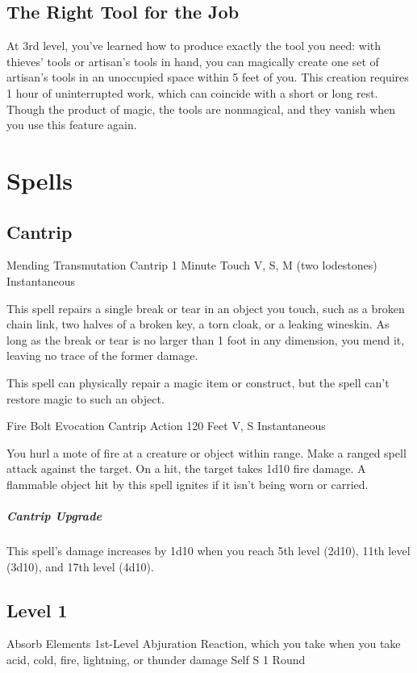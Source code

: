\documentclass[letterpaper,openany,oneside,twocolumn]{book}
\begin{document}
\subsection*{The Right Tool for the Job}
At 3rd level, you've learned how to produce exactly the tool you need: with thieves' tools or artisan's tools in hand, you can magically create one set of artisan's tools in an unoccupied space within 5 feet of you. This creation requires 1 hour of uninterrupted work, which can coincide with a short or long rest. Though the product of magic, the tools are nonmagical, and they vanish when you use this feature again.

\section*{Spells}
\subsection*{Cantrip}

\DndSpellHeader
  {Mending}
  {Transmutation Cantrip}
  {1 Minute}
  {Touch}
  {V, S, M (two lodestones)}
  {Instantaneous}

This spell repairs a single break or tear in an object you touch, such as a broken chain link, two halves of a broken key, a torn cloak, or a leaking wineskin. As long as the break or tear is no larger than 1 foot in any dimension, you mend it, leaving no trace of the former damage.

This spell can physically repair a magic item or construct, but the spell can't restore magic to such an object.

\DndSpellHeader
  {Fire Bolt}
  {Evocation Cantrip}
  {Action}
  {120 Feet}
  {V, S}
  {Instantaneous}

You hurl a mote of fire at a creature or object within range. Make a ranged spell attack against the target. On a hit, the target takes 1d10 fire damage. A flammable object hit by this spell ignites if it isn't being worn or carried.

\subparagraph*{Cantrip Upgrade} This spell's damage increases by 1d10 when you reach 5th level (2d10), 11th level (3d10), and 17th level (4d10).

\subsection*{Level 1}

\DndSpellHeader
  {Absorb Elements}
  {1st-Level Abjuration}
  {Reaction, which you take when you take acid, cold, fire, lightning, or thunder damage}
  {Self}
  {S}
  {1 Round}
\end{document}
